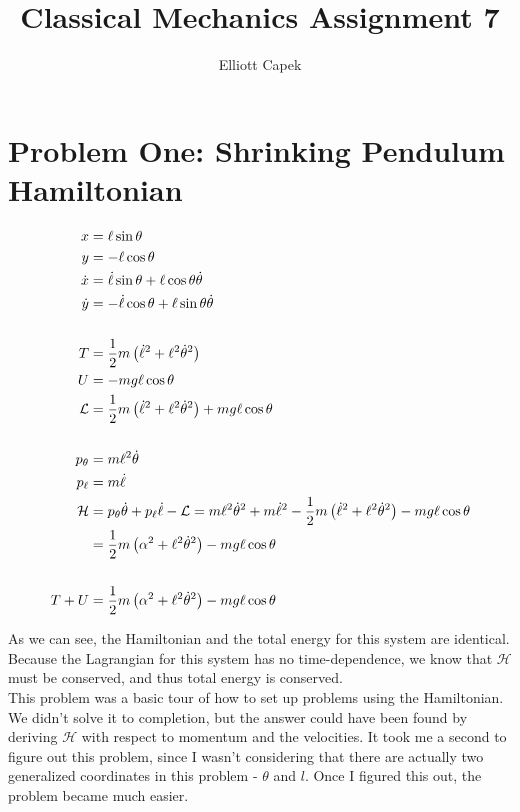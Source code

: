 \documentclass[10pt]{article} %
\title{Classical Mechanics Assignment 7}
\author{Elliott Capek}
\begin{document}
\maketitle{}

\section{Problem One: Shrinking Pendulum Hamiltonian}

\begin{align*}
  x &= \ell\sin\theta\\
  y &= -\ell\cos\theta\\
  \dot{x} &= \dot{\ell}\sin\theta + \ell\cos\theta\dot{\theta}\\
  \dot{y} &= -\dot{\ell}\cos\theta + \ell\sin\theta\dot{\theta}\\
  \vspace{1cm}\\
  T &= \frac{1}{2}m\left(\dot{\ell}^2 + \ell^2\dot{\theta}^2\right)\\
  U &= -mg\ell\cos\theta\\
  \mathcal{L} &= \frac{1}{2}m\left(\dot{\ell}^2 + \ell^2\dot{\theta}^2\right) + mg\ell\cos\theta\\
  \vspace{1cm}\\
  p_{\theta} &= m\ell^2\dot{\theta}\\
  p_{\ell} &= m\dot{\ell}\\
  \mathcal{H} &= p_{\theta}\dot{\theta} + p_{\ell}\dot{\ell} - \mathcal{L} = m\ell^2\dot{\theta}^2 + m\dot{\ell}^2 - \frac{1}{2}m\left(\dot{\ell}^2 + \ell^2\dot{\theta}^2\right) - mg\ell\cos\theta\\
  &= \frac{1}{2}m\left(\alpha^2 + \ell^2\dot{\theta}^2\right) - mg\ell\cos\theta\\
  \vspace{1cm}\\
  T + U &= \frac{1}{2}m\left(\alpha^2 + \ell^2\dot{\theta}^2\right) - mg\ell\cos\theta\\
\end{align*}

As we can see, the Hamiltonian and the total energy for this system are identical. Because the Lagrangian for this system has no time-dependence, we know that $\mathcal{H}$ must be conserved, and thus total energy is conserved.\\

This problem was a basic tour of how to set up problems using the Hamiltonian. We didn't solve it to completion, but the answer could have been found by deriving $\mathcal{H}$ with respect to momentum and the velocities. It took me a second to figure out this problem, since I wasn't considering that there are actually two generalized coordinates in this problem - $\theta$ and $l$. Once I figured this out, the problem became much easier.\\
\end{document}
